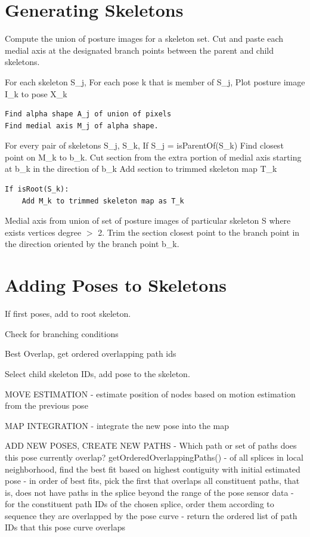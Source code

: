 \section{Generating Skeletons}
\label{generatingskeletons}

Compute the union of posture images for a skeleton set. Cut and paste each medial axis at the designated branch points between the parent and child skeletons.

For each skeleton S\_j,
 For each pose k that is member of S\_j,
 Plot posture image I\_k to pose X\_k

\begin{verbatim}
Find alpha shape A_j of union of pixels
Find medial axis M_j of alpha shape.
\end{verbatim}


For every pair of skeletons S\_j, S\_k,
 If S\_j = isParentOf(S\_k)
 Find closest point on M\_k to b\_k.
 Cut section from the extra portion of medial axis starting at b\_k in the direction of b\_k
 Add section to trimmed skeleton map T\_k

\begin{verbatim}
If isRoot(S_k):
    Add M_k to trimmed skeleton map as T_k
\end{verbatim}


Medial axis from union of set of posture images of particular skeleton S where exists vertices degree $>$ 2.
Trim the section closest point to the branch point in the direction oriented by the branch point b\_k.

\section{Adding Poses to Skeletons}
\label{addingposestoskeletons}

If first poses, add to root skeleton.

Check for branching conditions

Best Overlap, get ordered overlapping path ids

Select child skeleton IDs, add pose to the skeleton.

MOVE ESTIMATION
- estimate position of nodes based on motion estimation from the previous pose

MAP INTEGRATION
- integrate the new pose into the map

ADD NEW POSES, CREATE NEW PATHS
- Which path or set of paths does this pose currently overlap?
 getOrderedOverlappingPaths()
 - of all splices in local neighborhood, find the best fit based on highest contiguity with initial estimated pose
 - in order of best fits, pick the first that overlaps all constituent paths, that is, does not have paths in the splice beyond the range of the pose sensor data
 - for the constituent path IDs of the chosen splice, order them according to sequence they are overlapped by the pose curve
 - return the ordered list of path IDs that this pose curve overlaps

